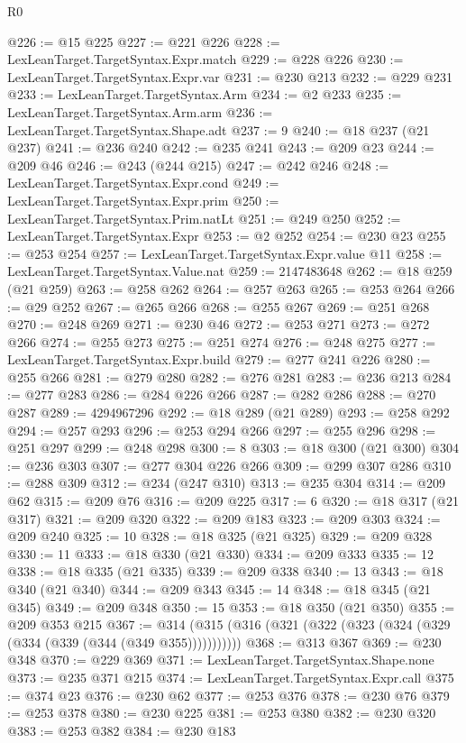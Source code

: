 \begin{lexlean}{R0}
\begin{coremodule}
@226 := @15 @225
@227 := @221 @226
@228 := LexLeanTarget.TargetSyntax.Expr.match
@229 := @228 @226
@230 := LexLeanTarget.TargetSyntax.Expr.var
@231 := @230 @213
@232 := @229 @231
@233 := LexLeanTarget.TargetSyntax.Arm
@234 := @2 @233
@235 := LexLeanTarget.TargetSyntax.Arm.arm
@236 := LexLeanTarget.TargetSyntax.Shape.adt
@237 := 9
@240 := @18 @237 (@21 @237)
@241 := @236 @240
@242 := @235 @241
@243 := @209 @23
@244 := @209 @46
@246 := @243 (@244 @215)
@247 := @242 @246
@248 := LexLeanTarget.TargetSyntax.Expr.cond
@249 := LexLeanTarget.TargetSyntax.Expr.prim
@250 := LexLeanTarget.TargetSyntax.Prim.natLt
@251 := @249 @250
@252 := LexLeanTarget.TargetSyntax.Expr
@253 := @2 @252
@254 := @230 @23
@255 := @253 @254
@257 := LexLeanTarget.TargetSyntax.Expr.value @11
@258 := LexLeanTarget.TargetSyntax.Value.nat
@259 := 2147483648
@262 := @18 @259 (@21 @259)
@263 := @258 @262
@264 := @257 @263
@265 := @253 @264
@266 := @29 @252
@267 := @265 @266
@268 := @255 @267
@269 := @251 @268
@270 := @248 @269
@271 := @230 @46
@272 := @253 @271
@273 := @272 @266
@274 := @255 @273
@275 := @251 @274
@276 := @248 @275
@277 := LexLeanTarget.TargetSyntax.Expr.build
@279 := @277 @241 @226
@280 := @255 @266
@281 := @279 @280
@282 := @276 @281
@283 := @236 @213
@284 := @277 @283
@286 := @284 @226 @266
@287 := @282 @286
@288 := @270 @287
@289 := 4294967296
@292 := @18 @289 (@21 @289)
@293 := @258 @292
@294 := @257 @293
@296 := @253 @294 @266
@297 := @255 @296
@298 := @251 @297
@299 := @248 @298
@300 := 8
@303 := @18 @300 (@21 @300)
@304 := @236 @303
@307 := @277 @304 @226 @266
@309 := @299 @307 @286
@310 := @288 @309
@312 := @234 (@247 @310)
@313 := @235 @304
@314 := @209 @62
@315 := @209 @76
@316 := @209 @225
@317 := 6
@320 := @18 @317 (@21 @317)
@321 := @209 @320
@322 := @209 @183
@323 := @209 @303
@324 := @209 @240
@325 := 10
@328 := @18 @325 (@21 @325)
@329 := @209 @328
@330 := 11
@333 := @18 @330 (@21 @330)
@334 := @209 @333
@335 := 12
@338 := @18 @335 (@21 @335)
@339 := @209 @338
@340 := 13
@343 := @18 @340 (@21 @340)
@344 := @209 @343
@345 := 14
@348 := @18 @345 (@21 @345)
@349 := @209 @348
@350 := 15
@353 := @18 @350 (@21 @350)
@355 := @209 @353 @215
@367 := @314 (@315 (@316 (@321 (@322 (@323 (@324 (@329 (@334 (@339 (@344 (@349 @355)))))))))))
@368 := @313 @367
@369 := @230 @348
@370 := @229 @369
@371 := LexLeanTarget.TargetSyntax.Shape.none
@373 := @235 @371 @215
@374 := LexLeanTarget.TargetSyntax.Expr.call
@375 := @374 @23
@376 := @230 @62
@377 := @253 @376
@378 := @230 @76
@379 := @253 @378
@380 := @230 @225
@381 := @253 @380
@382 := @230 @320
@383 := @253 @382
@384 := @230 @183

\end{coremodule}
\end{lexlean}
